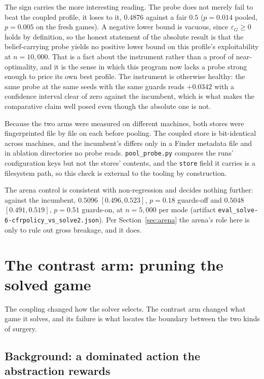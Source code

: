 \documentclass[11pt]{article}
\theoremstyle{plain}
\theoremstyle{definition}
\theoremstyle{remark}
\newcommand{\code}[1]{\texttt{\small #1}}
\newcommand{\game}{\ensuremath{G}}
\newcommand{\epsG}{\ensuremath{\varepsilon_{\game}}}
\begin{document}
The sign carries the more interesting reading. The probe does not
merely fail to beat the coupled profile, it loses to it, $0.4876$
against a fair $0.5$ ($p=0.014$ pooled, $p=0.005$ on the fresh games).
A negative lower bound is vacuous, since $\epsG \ge 0$ holds by
definition, so the honest statement of the absolute result is that the
belief-carrying probe yields no positive lower bound on this profile's
exploitability at $n=10{,}000$. That is a fact about the instrument
rather than a proof of near-optimality, and it is the sense in which
this program now lacks a probe strong enough to price its own best
profile. The instrument is otherwise healthy: the same probe at the
same seeds with the same guards reads $+0.0342$ with a confidence
interval clear of zero against the incumbent, which is what makes the
comparative claim well posed even though the absolute one is not.

Because the two arms were measured on different machines, both stores
were fingerprinted file by file on each before pooling. The coupled
store is bit-identical across machines, and the incumbent's differs
only in a Finder metadata file and in ablation directories no probe
reads. \code{pool\_probe.py} compares the runs' configuration keys but
not the stores' contents, and the \code{store} field it carries is a
filesystem path, so this check is external to the tooling by
construction.

The arena control is consistent with non-regression and decides nothing
further: against the incumbent, $0.5096$ $[0.496,0.523]$, $p=0.18$
guards-off and $0.5048$ $[0.491,0.519]$, $p=0.51$ guards-on, at
$n=5{,}000$ per mode (artifact
\code{eval\_solve-6-cfrpolicy\_vs\_solve2.json}). Per
Section~\ref{sec:arena} the arena's role here is only to rule out gross
breakage, and it does.

\section{The contrast arm: pruning the solved game}\label{sec:pruning}

The coupling changed how the solver selects. The contrast arm changed
what game it solves, and its failure is what locates the boundary
between the two kinds of surgery.

\subsection{Background: a dominated action the abstraction rewards}
\end{document}
